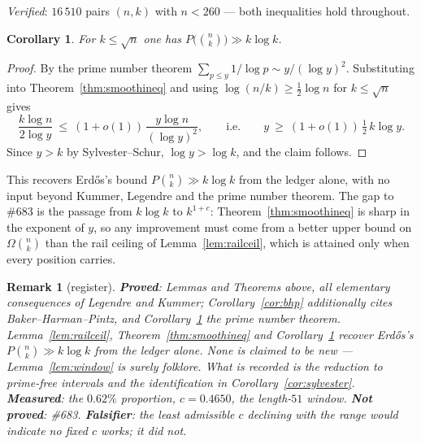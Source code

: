 \documentclass[11pt]{article}
\newtheorem{corollary}[theorem]{Corollary}
\newtheorem{remark}[theorem]{Remark}
\begin{document}
\emph{Verified}: $16\,510$ pairs $(n,k)$ with $n<260$ --- both inequalities hold throughout.

\begin{corollary}\label{cor:klogk}
For $k\le\sqrt n$ one has $P\bigl(\binom nk\bigr)\gg k\log k$.
\end{corollary}

\begin{proof}
By the prime number theorem $\sum_{p\le y}1/\log p\sim y/(\log y)^{2}$.  Substituting into
Theorem~\ref{thm:smoothineq} and using $\log(n/k)\ge\tfrac12\log n$ for $k\le\sqrt n$ gives
\[
  \frac{k\log n}{2\log y}\ \le\ (1+o(1))\,\frac{y\log n}{(\log y)^{2}},
  \qquad\text{i.e.}\qquad y\ \ge\ (1+o(1))\,\tfrac12\,k\log y .
\]
Since $y>k$ by Sylvester--Schur, $\log y>\log k$, and the claim follows.
\end{proof}

This recovers Erd\H{o}s's bound $P\binom nk\gg k\log k$ from the ledger alone, with no input
beyond Kummer, Legendre and the prime number theorem.  The gap to \#683 is the passage from
$k\log k$ to $k^{1+c}$: Theorem~\ref{thm:smoothineq} is sharp in the exponent of $y$, so any
improvement must come from a better upper bound on $\Omega\binom nk$ than the rail ceiling
of Lemma~\ref{lem:railceil}, which is attained only when every position carries.

\begin{remark}[register]
\textbf{Proved}: Lemmas and Theorems above, all elementary consequences of Legendre and
Kummer; Corollary~\ref{cor:bhp} additionally cites Baker--Harman--Pintz, and
Corollary~\ref{cor:klogk} the prime number theorem.  Lemma~\ref{lem:railceil},
Theorem~\ref{thm:smoothineq} and Corollary~\ref{cor:klogk} recover Erd\H{o}s's
$P\binom nk\gg k\log k$ from the ledger alone.  None is claimed to
be new --- Lemma~\ref{lem:window} is surely folklore.  What is recorded is the reduction to
prime-free intervals and the identification in Corollary~\ref{cor:sylvester}.
\textbf{Measured}: the $0.62\%$ proportion, $c=0.4650$, the length-$51$ window.
\textbf{Not proved}: \#683.  \textbf{Falsifier}: the least admissible $c$ declining with the
range would indicate no fixed $c$ works; it did not.
\end{remark}
\end{document}
